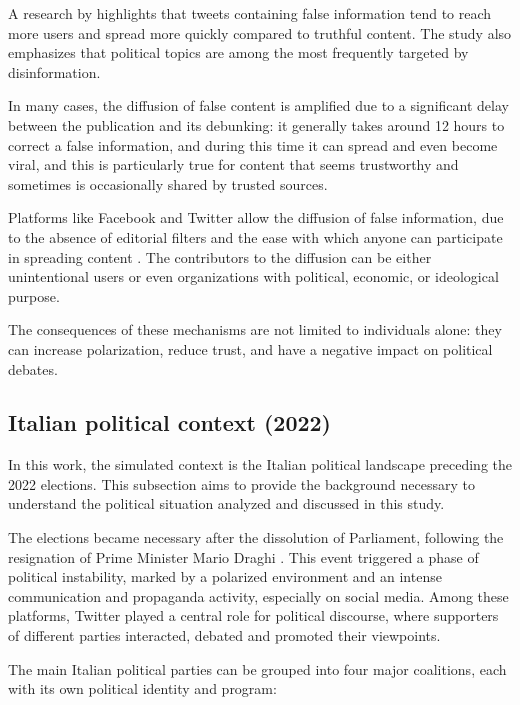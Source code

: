 \medskip
A research by \citet{kumar2018falseinformationwebsocial} highlights that tweets containing false information tend to reach more users and spread more quickly compared to truthful content. The study also emphasizes that political topics are among the most frequently targeted by disinformation.

In many cases, the diffusion of false content is amplified due to a significant delay between the publication and its debunking: it generally takes around 12 hours to correct a false information, and during this time it can spread and even become viral, and this is particularly true for content that seems trustworthy and sometimes is occasionally shared by trusted sources.

\medskip
Platforms like Facebook and Twitter allow the diffusion of false information, due to the absence of editorial filters and the ease with which anyone can participate in spreading content \cite{hilary2021social}.
The contributors to the diffusion can be either unintentional users or even organizations with political, economic, or ideological purpose.

The consequences of these mechanisms are not limited to individuals alone: they can increase polarization, reduce trust, and have a negative impact on political debates.



\subsection{Italian political context (2022)}
In this work, the simulated context is the Italian political landscape preceding the 2022 elections.
This subsection aims to provide the background necessary to understand the political situation analyzed and discussed in this study.

\medskip
The elections became necessary after the dissolution of Parliament, following the resignation of Prime Minister Mario Draghi \cite{pierri2024drivers}.
This event triggered a phase of political instability, marked by a polarized environment and an intense communication and propaganda activity, especially on social media.
Among these platforms, Twitter played a central role for political discourse, where supporters of different parties interacted, debated and promoted their viewpoints.

\medskip
The main Italian political parties can be grouped into four major coalitions, each with its own political identity and program:

